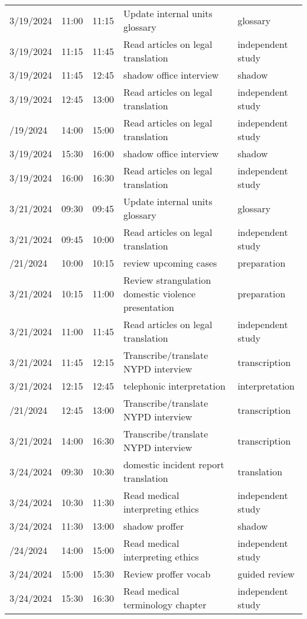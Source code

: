 \begin{table}
\begin{tabular}{lllll}
3/19/2024 & 11:00 & 11:15 & Update internal units glossary & glossary\\
3/19/2024 & 11:15 & 11:45 & Read articles on legal translation & independent study\\
3/19/2024 & 11:45 & 12:45 & shadow office interview & shadow\\
3/19/2024 & 12:45 & 13:00 & Read articles on legal translation & independent study\\
\addlinespace
3/19/2024 & 14:00 & 15:00 & Read articles on legal translation & independent study\\
3/19/2024 & 15:30 & 16:00 & shadow office interview & shadow\\
3/19/2024 & 16:00 & 16:30 & Read articles on legal translation & independent study\\
3/21/2024 & 09:30 & 09:45 & Update internal units glossary & glossary\\
3/21/2024 & 09:45 & 10:00 & Read articles on legal translation & independent study\\
\addlinespace
3/21/2024 & 10:00 & 10:15 & review upcoming cases & preparation\\
3/21/2024 & 10:15 & 11:00 & Review strangulation domestic violence presentation & preparation\\
3/21/2024 & 11:00 & 11:45 & Read articles on legal translation & independent study\\
3/21/2024 & 11:45 & 12:15 & Transcribe/translate NYPD interview & transcription\\
3/21/2024 & 12:15 & 12:45 & telephonic interpretation & interpretation\\
\addlinespace
3/21/2024 & 12:45 & 13:00 & Transcribe/translate NYPD interview & transcription\\
3/21/2024 & 14:00 & 16:30 & Transcribe/translate NYPD interview & transcription\\
3/24/2024 & 09:30 & 10:30 & domestic incident report translation & translation\\
3/24/2024 & 10:30 & 11:30 & Read medical interpreting ethics & independent study\\
3/24/2024 & 11:30 & 13:00 & shadow proffer & shadow\\
\addlinespace
3/24/2024 & 14:00 & 15:00 & Read medical interpreting ethics & independent study\\
3/24/2024 & 15:00 & 15:30 & Review proffer vocab & guided review\\
3/24/2024 & 15:30 & 16:30 & Read medical terminology chapter & independent study\\

\end{tabular}
\end{table}
